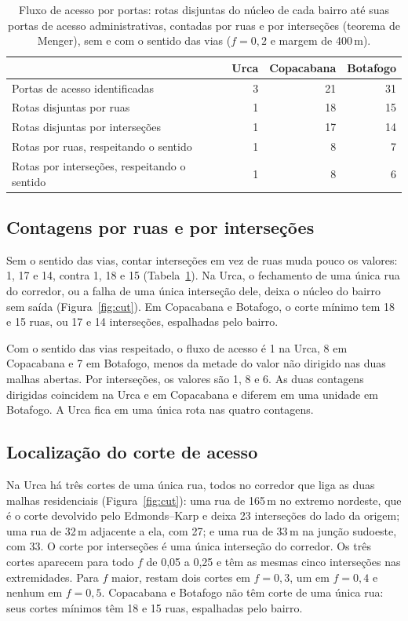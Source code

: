 \begin{table}[t]
\centering
\caption{Fluxo de acesso por portas: rotas disjuntas do núcleo de cada
bairro até suas portas de acesso administrativas, contadas por ruas e
por interseções (teorema de Menger), sem e com o sentido das vias
($f=0{,}2$ e margem de 400\,m).}
\label{tab:acesso}
\begin{tabular}{lrrr}
\toprule
 & Urca & Copacabana & Botafogo \\
\midrule
Portas de acesso identificadas                       & 3 & 21 & 31 \\
Rotas disjuntas por ruas                             & 1 & 18 & 15 \\
Rotas disjuntas por interseções                      & 1 & 17 & 14 \\
Rotas por ruas, respeitando o sentido                & 1 & 8  & 7 \\
Rotas por interseções, respeitando o sentido         & 1 & 8  & 6 \\
\bottomrule
\end{tabular}
\end{table}

\subsection{Contagens por ruas e por interseções}
\label{sec:res-ruas-int}

Sem o sentido das vias, contar interseções em vez de ruas muda pouco os
valores: 1, 17 e 14, contra 1, 18 e 15 (Tabela~\ref{tab:acesso}). Na
Urca, o fechamento de uma única rua do corredor, ou a falha de uma única
interseção dele, deixa o núcleo do bairro sem saída (Figura~\ref{fig:cut}). Em
Copacabana e Botafogo, o corte mínimo tem 18 e 15 ruas, ou 17 e 14
interseções, espalhadas pelo bairro.

Com o sentido das vias respeitado, o fluxo de acesso é 1 na Urca, 8 em
Copacabana e 7 em Botafogo, menos da metade do valor não dirigido nas
duas malhas abertas. Por interseções, os valores são 1, 8 e 6. As duas
contagens dirigidas coincidem na Urca e em Copacabana e diferem em uma
unidade em Botafogo. A Urca fica em uma única rota nas quatro contagens.

\subsection{Localização do corte de acesso}
\label{sec:res-cut}

Na Urca há três cortes de uma única rua, todos no corredor que liga as
duas malhas residenciais (Figura~\ref{fig:cut}): uma rua de 165\,m no
extremo nordeste, que é o corte devolvido pelo Edmonds--Karp e deixa 23
interseções do lado da origem; uma rua de 32\,m adjacente a ela, com 27;
e uma rua de 33\,m na junção sudoeste, com 33. O corte por interseções é
uma única interseção do corredor. Os três cortes aparecem para todo $f$
de 0,05 a 0,25 e têm as mesmas cinco interseções nas extremidades. Para
$f$ maior, restam dois cortes em $f=0{,}3$, um em $f=0{,}4$ e nenhum em
$f=0{,}5$. Copacabana e Botafogo não têm corte de uma única rua: seus
cortes mínimos têm 18 e 15 ruas, espalhadas pelo bairro.

